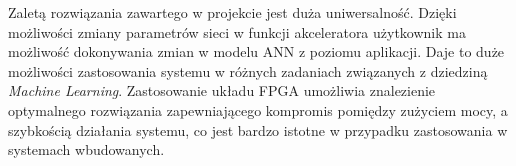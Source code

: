 Zaletą rozwiązania zawartego w projekcie jest duża uniwersalność. Dzięki możliwości zmiany 
parametrów sieci w funkcji akceleratora użytkownik ma możliwość dokonywania zmian w modelu ANN z 
poziomu aplikacji. Daje to duże możliwości zastosowania systemu w różnych zadaniach związanych z 
dziedziną \emph{Machine Learning}. Zastosowanie układu FPGA umożliwia znalezienie optymalnego 
rozwiązania zapewniającego kompromis pomiędzy zużyciem mocy, a szybkością działania systemu, co jest bardzo istotne w przypadku zastosowania w systemach wbudowanych.
